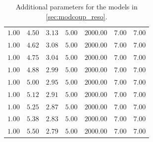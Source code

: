 \begin{table}[H]
\begin{tabular}{lllllll}
   $1.00$  & $4.50$  & $3.13$   & $5.00$ & $2000.00$ & $7.00$               & $7.00$      \\
   $1.00$  & $4.62$  & $3.08$   & $5.00$ & $2000.00$ & $7.00$               & $7.00$      \\
   $1.00$  & $4.75$  & $3.04$   & $5.00$ & $2000.00$ & $7.00$               & $7.00$      \\
   $1.00$  & $4.88$  & $2.99$   & $5.00$ & $2000.00$ & $7.00$               & $7.00$      \\
   $1.00$  & $5.00$  & $2.95$   & $5.00$ & $2000.00$ & $7.00$               & $7.00$      \\
   $1.00$  & $5.12$  & $2.91$   & $5.00$ & $2000.00$ & $7.00$               & $7.00$      \\
   $1.00$  & $5.25$  & $2.87$   & $5.00$ & $2000.00$ & $7.00$               & $7.00$      \\
   $1.00$  & $5.38$  & $2.83$   & $5.00$ & $2000.00$ & $7.00$               & $7.00$      \\
   $1.00$  & $5.50$  & $2.79$   & $5.00$ & $2000.00$ & $7.00$               & $7.00$      \\
  \hline
  \end{tabular}
  \caption{\label{tab:plus_tune}Additional parameters for the models in
     \cref{sec:modcoup_reso}.}
\end{table}

